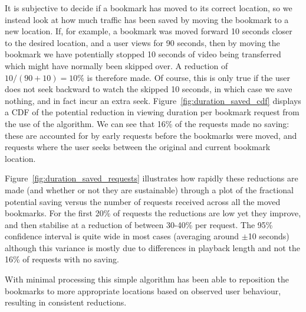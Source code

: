 \documentclass[a4paper,11pt]{article}
\newcommand{\capttext}{\protect\centering\em}
\begin{document}
It is subjective to decide if a bookmark has moved to its correct location, so we instead look at how much traffic has been saved by moving the bookmark to a new location. If, for example, a bookmark was moved forward 10 seconds closer to the desired location, and a user views for 90 seconds, then by moving the bookmark we have potentially stopped 10 seconds of video being transferred which might have normally been skipped over. A reduction of $10/(90+10)=10\%$ is therefore made. Of course, this is only true if the user does not seek backward to watch the skipped 10 seconds, in which case we save nothing, and in fact incur an extra seek. Figure~\ref{fig:duration_saved_cdf} displays a CDF of the potential reduction in viewing duration per bookmark request from the use of the algorithm. We can see that 16\% of the requests made no saving: these are accounted for by early requests before the bookmarks were moved, and requests where the user seeks between the original and current bookmark location. %

Figure~\ref{fig:duration_saved_requests} illustrates how rapidly these reductions are made (and whether or not they are sustainable) through a plot of the fractional potential saving versus the number of requests received across all the moved bookmarks. For the first 20\% of requests the reductions are low yet they improve, and then stabilise at a reduction of between 30-40\% per request. The 95\% confidence interval is quite wide in most cases (averaging around $\pm$10 seconds) although this variance is mostly due to differences in playback length and not the 16\% of requests with no saving.

With minimal processing this simple algorithm has been able to reposition the bookmarks to more appropriate locations based on observed user behaviour, resulting in consistent reductions.

%

\end{document}
